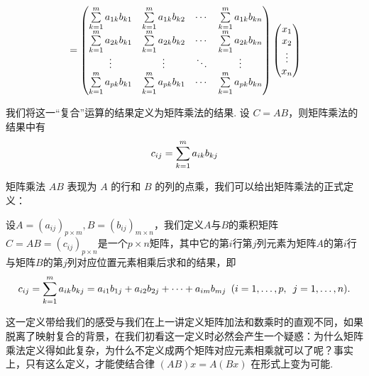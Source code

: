 \begin{align*}
    &= \begin{pmatrix}
        \sum_{k=1}^m\limits a_{1k} b_{k1} & \sum_{k=1}^m\limits a_{1k} b_{k2} & \cdots & \sum_{k=1}^m\limits a_{1k} b_{kn} \\
        \sum_{k=1}^m\limits a_{2k} b_{k1} & \sum_{k=1}^m\limits a_{2k} b_{k2} & \cdots & \sum_{k=1}^m\limits a_{2k} b_{kn} \\
        \vdots & \vdots & \ddots & \vdots \\
        \sum_{k=1}^m\limits a_{pk} b_{k1} & \sum_{k=1}^m\limits a_{pk} b_{k1} & \cdots & \sum_{k=1}^m\limits a_{pk} b_{kn}
    \end{pmatrix} \begin{pmatrix}
        x_1 \\ x_2 \\ \vdots \\ x_n
    \end{pmatrix}\\
\end{align*}

我们将这一``复合''运算的结果定义为矩阵乘法的结果. 设 $C = AB$，则矩阵乘法的结果中有
\[
    c_{ij} = \sum_{k=1}^m\limits a_{ik} b_{kj}
\]

矩阵乘法 $AB$ 表现为 $A$ 的行和 $B$ 的列的点乘，我们可以给出矩阵乘法的正式定义：
\begin{definition}{}{}
    设$A=(a_{ij})_{p\times m},B=(b_{ij})_{m\times n}$，我们定义$A$与$B$的乘积矩阵$C=AB=(c_{ij})_{p\times n}$是一个$p\times n$矩阵，其中它的第$i$行第$j$列元素为矩阵$A$的第$i$行与矩阵$B$的第$j$列对应位置元素相乘后求和的结果，即
    \[
        c_{ij}
        =\sum_{k=1}^m\limits a_{ik} b_{kj}
        =a_{i1}b_{1j}+a_{i2}b_{2j}+\cdots+a_{im}b_{mj}\enspace(i=1,\ldots,p,\enspace j=1,\ldots,n).
    \]
\end{definition}

这一定义带给我们的感受与我们在上一讲定义矩阵加法和数乘时的直观不同，如果脱离了映射复合的背景，在我们初看这一定义时必然会产生一个疑惑：为什么矩阵乘法定义得如此复杂，为什么不定义成两个矩阵对应元素相乘就可以了呢？事实上，只有这么定义，才能使结合律 $(AB)x = A(Bx)$ 在形式上变为可能.


